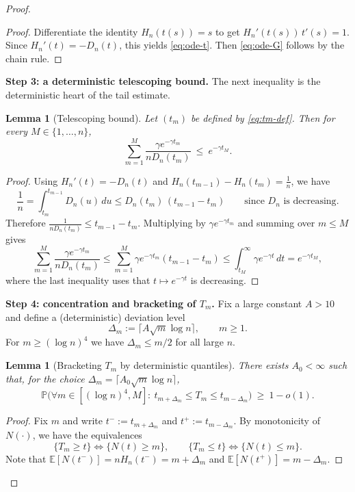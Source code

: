 \documentclass[10pt]{article}
\newtheorem{lem}[thm]{Lemma}
\numberwithin{equation}{section}
\begin{document}
\begin{proof}
\begin{proof}
Differentiate the identity $H_n(t(s))=s$ to get $H_n'(t(s))\,t'(s)=1$.
Since $H_n'(t)=-D_n(t)$, this yields \eqref{eq:ode-t}. Then \eqref{eq:ode-G} follows by the chain rule.
\end{proof}

\textbf{Step 3: a deterministic telescoping bound.}
The next inequality is the deterministic heart of the tail estimate.

\begin{lem}[Telescoping bound]\label{lem:telescoping}
Let $(t_m)$ be defined by \eqref{eq:tm-def}. Then for every $M\in\{1,\dots,n\}$,
\begin{equation}\label{eq:telescoping}
\sum_{m=1}^{M}\frac{\gamma e^{-\gamma t_m}}{nD_n(t_m)} \ \le\ e^{-\gamma t_M}.
\end{equation}
\end{lem}

\begin{proof}
Using $H_n'(t)=-D_n(t)$ and $H_n(t_{m-1})-H_n(t_m)=\frac{1}{n}$, we have
\[
\frac{1}{n}
= \int_{t_m}^{t_{m-1}} D_n(u)\,du
\le D_n(t_m)\,(t_{m-1}-t_m)
\qquad\text{since }D_n\text{ is decreasing}.
\]
Therefore $\frac{1}{nD_n(t_m)}\le t_{m-1}-t_m$.
Multiplying by $\gamma e^{-\gamma t_m}$ and summing over $m\le M$ gives
\[
\sum_{m=1}^{M}\frac{\gamma e^{-\gamma t_m}}{nD_n(t_m)}
\le
\sum_{m=1}^{M}\gamma e^{-\gamma t_m}(t_{m-1}-t_m)
\le
\int_{t_M}^{\infty}\gamma e^{-\gamma t}\,dt
=e^{-\gamma t_M},
\]
where the last inequality uses that $t\mapsto e^{-\gamma t}$ is decreasing.
\end{proof}

\textbf{Step 4: concentration and bracketing of $T_m$.}
Fix a large constant $A>10$ and define a (deterministic) deviation level
\[
\Delta_m := \lceil A\sqrt{m}\log n\rceil,\qquad m\ge1.
\]
For $m\ge (\log n)^4$ we have $\Delta_m\le m/2$ for all large $n$.

\begin{lem}[Bracketing $T_m$ by deterministic quantiles]\label{lem:bracket-Tm}
There exists $A_0<\infty$ such that, for the choice $\Delta_m=\lceil A_0\sqrt m\log n\rceil$,
\[
\mathbb P\big(\forall m\in[(\log n)^4,M]:\ t_{m+\Delta_m}\le T_m\le t_{m-\Delta_m}\big)\ \ge\ 1-o(1).
\]
\end{lem}

\begin{proof}
Fix $m$ and write $t^-:=t_{m+\Delta_m}$ and $t^+:=t_{m-\Delta_m}$.
By monotonicity of $N(\cdot)$, we have the equivalences
\[
\{T_m\ge t\}\iff \{N(t)\ge m\},\qquad \{T_m\le t\}\iff \{N(t)\le m\}.
\]
Note that $\mathbb E[N(t^-)]=nH_n(t^-)=m+\Delta_m$ and $\mathbb E[N(t^+)]=m-\Delta_m$.


\end{proof}
\end{proof}
\end{document}

